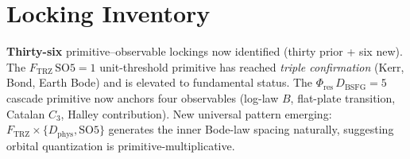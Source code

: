 \documentclass[11pt]{article}
\newcommand{\Ftrz}{F_{\mathrm{TRZ}}}
\newcommand{\Phires}{\Phi_{\mathrm{res}}}
\newcommand{\Dphys}{D_{\mathrm{phys}}}
\newcommand{\Dbsfg}{D_{\mathrm{BSFG}}}
\newcommand{\SOfive}{\mathrm{SO5}}
\begin{document}
\section{Locking Inventory}
\textbf{Thirty-six} primitive--observable lockings now identified
(thirty prior + six new). The $\Ftrz\,\SOfive = 1$ unit-threshold primitive
has reached \emph{triple confirmation} (Kerr, Bond, Earth Bode) and is
elevated to fundamental status. The $\Phires\,\Dbsfg = 5$ cascade primitive
now anchors four observables (log-law $B$, flat-plate transition,
Catalan $C_3$, Halley contribution). New universal pattern emerging:
$\Ftrz \times \{\Dphys, \SOfive\}$ generates the inner Bode-law spacing
naturally, suggesting orbital quantization is primitive-multiplicative.
\end{document}
